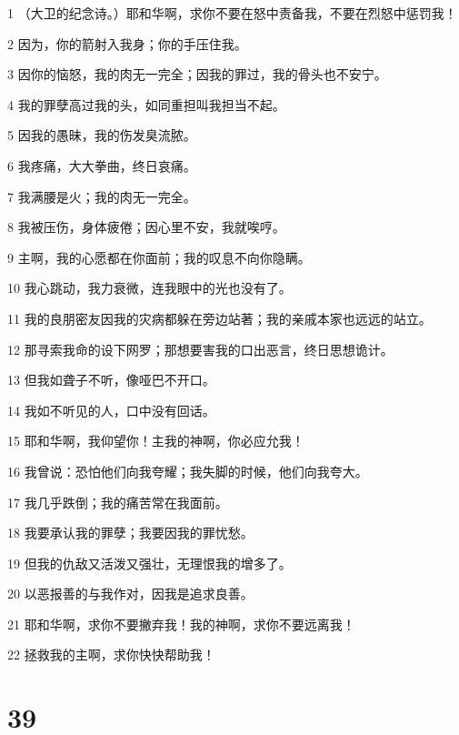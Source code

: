 \par 1 （大卫的纪念诗。）耶和华啊，求你不要在怒中责备我，不要在烈怒中惩罚我！
\par 2 因为，你的箭射入我身；你的手压住我。
\par 3 因你的恼怒，我的肉无一完全；因我的罪过，我的骨头也不安宁。
\par 4 我的罪孽高过我的头，如同重担叫我担当不起。
\par 5 因我的愚昧，我的伤发臭流脓。
\par 6 我疼痛，大大拳曲，终日哀痛。
\par 7 我满腰是火；我的肉无一完全。
\par 8 我被压伤，身体疲倦；因心里不安，我就唉哼。
\par 9 主啊，我的心愿都在你面前；我的叹息不向你隐瞒。
\par 10 我心跳动，我力衰微，连我眼中的光也没有了。
\par 11 我的良朋密友因我的灾病都躲在旁边站著；我的亲戚本家也远远的站立。
\par 12 那寻索我命的设下网罗；那想要害我的口出恶言，终日思想诡计。
\par 13 但我如聋子不听，像哑巴不开口。
\par 14 我如不听见的人，口中没有回话。
\par 15 耶和华啊，我仰望你！主我的神啊，你必应允我！
\par 16 我曾说：恐怕他们向我夸耀；我失脚的时候，他们向我夸大。
\par 17 我几乎跌倒；我的痛苦常在我面前。
\par 18 我要承认我的罪孽；我要因我的罪忧愁。
\par 19 但我的仇敌又活泼又强壮，无理恨我的增多了。
\par 20 以恶报善的与我作对，因我是追求良善。
\par 21 耶和华啊，求你不要撇弃我！我的神啊，求你不要远离我！
\par 22 拯救我的主啊，求你快快帮助我！

\chapter{39}

